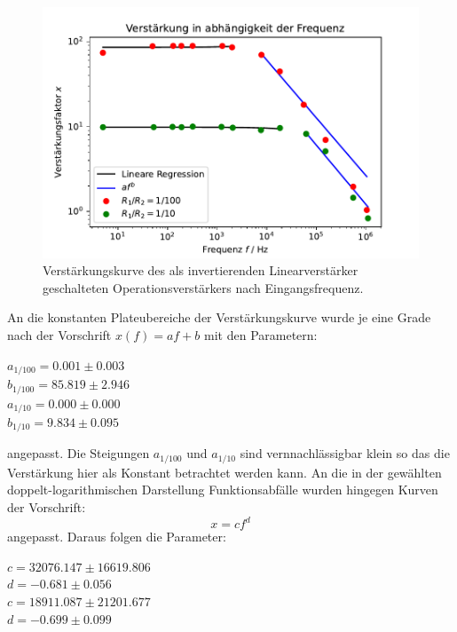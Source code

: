 \label{sec:linearverstaerker}
\begin{figure}
    \centering
    \includegraphics{content/grafiken/verstaerkung.pdf}
    \caption{Verstärkungskurve des als invertierenden Linearverstärker geschalteten Operationsverstärkers nach Eingangsfrequenz.}
    \label{fig:linearverstaerker}
  \end{figure}
  An die konstanten Plateubereiche der Verstärkungskurve wurde je eine Grade nach der Vorschrift $x(f)=af+b$ 
  mit den Parametern:
   \begin{center}
       $a_{1/100} =  0.001\pm 0.003$\\
       $b_{1/100} = 85.819\pm 2.946$\\
       $a_{1/10}  =  0.000\pm 0.000$\\
       $b_{1/10}  = 9.834 \pm 0.095$\\
   \end{center}
 angepasst. Die Steigungen $a_{1/100}$ und $a_{1/10}$ sind vernnachlässigbar klein so das die Verstärkung
 hier als Konstant betrachtet werden kann. An die in der gewählten doppelt-logarithmischen Darstellung
 Funktionsabfälle wurden hingegen Kurven der Vorschrift: 
 \begin{equation}
    \label{eq:exponentialgesetz}
    x=cf^d
 \end{equation}
  angepasst. Daraus folgen die Parameter:
  \begin{center}
    $c = 32076.147  \pm 16619.806$\\
    $d =   -0.681 \pm 0.056$\\
    $c = 18911.087 \pm 21201.677$\\
    $d =   -0.699 \pm 0.099$\\
  \end{center}
